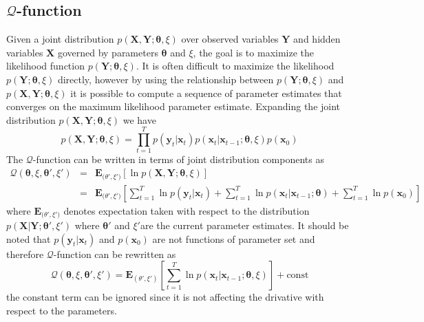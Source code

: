 \documentclass[]{article}
\begin{document}
\subsection{$\mathcal Q$-function}
Given a joint distribution $p(\mathbf X,\mathbf Y;\boldsymbol \theta,\xi)$ over observed variables $\mathbf Y$ and hidden variables $\mathbf X$ governed by parameters $\boldsymbol \theta$ and $\xi$, the goal is to maximize the likelihood function $p(\mathbf Y;\boldsymbol \theta,\xi)$. It is often difficult to maximize the likelihood  $p(\mathbf Y;\boldsymbol \theta,\xi)$ directly, however by using the relationship between $p(\mathbf Y;\boldsymbol \theta,\xi)$ and $p(\mathbf X,\mathbf Y;\boldsymbol \theta,\xi)$ it is possible to compute 
a sequence of parameter estimates  that converges on the maximum likelihood parameter estimate. Expanding the joint distribution $p(\mathbf X,\mathbf Y;\boldsymbol \theta,\xi)$ we have
\begin{equation}
 p(\mathbf X,\mathbf Y;\boldsymbol \theta,\xi)=\prod_{t=1}^{T} p(\mathbf y_t|\mathbf x_t)p(\mathbf x_t|\mathbf x_{t-1};\boldsymbol \theta, \xi)p(\mathbf x_0)
\label{eq:jointdistribution}
\end{equation}
The $\mathcal Q$-function can be written in terms of joint distribution components as
\begin{eqnarray}
 \mathcal Q(\boldsymbol \theta,\xi,\boldsymbol\theta',\xi')&=&\mathbf E_{\boldsymbol (\theta',\xi')}[\ln p(\mathbf X,\mathbf Y;\boldsymbol \theta,\xi)]\nonumber\\
&=&\mathbf E_{\boldsymbol (\theta',\xi')}[\sum_{t=1}^{T}\ln p(\mathbf y_t|\mathbf x_t)+\sum_{t=1}^{T}\ln p(\mathbf x_t|\mathbf x_{t-1};\boldsymbol \theta)+\sum_{t=1}^{T}\ln p(\mathbf x_0)]
\end{eqnarray}
where $ \mathbf E_{\boldsymbol (\theta',\xi')}$ denotes expectation taken with respect to the distribution $p(\mathbf X | \mathbf Y;\boldsymbol \theta',\xi') $ where $\boldsymbol \theta'$ and $\xi'$are the current parameter estimates. It should be noted that
$p(\mathbf y_t|\mathbf x_t)$ and $p(\mathbf x_0)$ are not functions of parameter set and therefore $\mathcal Q$-function can be rewritten as
\begin{equation}
\mathcal Q(\boldsymbol \theta,\xi,\boldsymbol\theta',\xi')=\mathbf E_{(\theta',\xi')}[\sum_{t=1}^{T}\ln p(\mathbf x_t|\mathbf x_{t-1};\boldsymbol \theta ,\xi)]+\mathrm{const}
\end{equation}
the constant term can be ignored since it is not affecting the drivative with respect to the parameters. 
\end{document}
